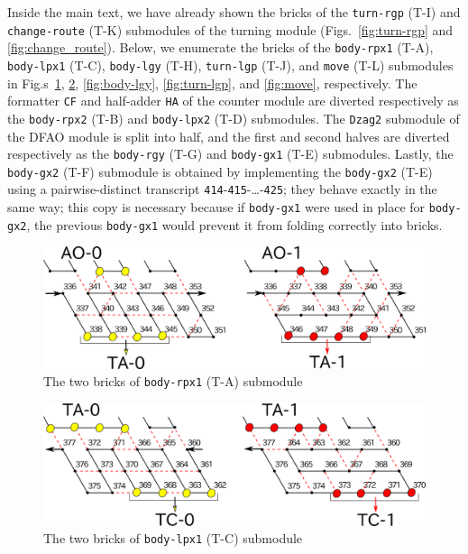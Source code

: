 \documentclass[runningheads]{llncs}
\begin{document}
Inside the main text, we have already shown the bricks of the \texttt{turn-rgp} (T-I) and \texttt{change-route} (T-K) submodules of the turning module (Figs.~\ref{fig:turn-rgp} and \ref{fig:change_route}). 
Below, we enumerate the bricks of the \texttt{body-rpx1} (T-A), \texttt{body-lpx1} (T-C), \texttt{body-lgy} (T-H), \texttt{turn-lgp} (T-J), and \texttt{move} (T-L) submodules in Fig.s~\ref{fig:body-rpx1}, \ref{fig:body-lpx1}, \ref{fig:body-lgy}, \ref{fig:turn-lgp}, and \ref{fig:move}, respectively. 
The formatter \texttt{CF} and half-adder \texttt{HA} of the counter module are diverted respectively as the \texttt{body-rpx2} (T-B) and \texttt{body-lpx2} (T-D) submodules. 
The \texttt{Dzag2} submodule of the DFAO module is split into half, and the first and second halves are diverted respectively as the \texttt{body-rgy} (T-G) and \texttt{body-gx1} (T-E) submodules. 
Lastly, the \texttt{body-gx2} (T-F) submodule is obtained by implementing the \texttt{body-gx2} (T-E) using a pairwise-distinct transcript \texttt{414}-\texttt{415}-\dots-\texttt{425}; they behave exactly in the same way; this copy is necessary because if \texttt{body-gx1} were used in place for \texttt{body-gx2}, the previous \texttt{body-gx1} would prevent it from folding correctly into bricks. 

\begin{figure}[h]
\centering
\includegraphics[width=\linewidth]{Figs/body-rpx1.png}
\caption{The two bricks of \texttt{body-rpx1} (T-A) submodule}
\label{fig:body-rpx1}
\end{figure}

\begin{figure}[h]
\centering
\includegraphics[width=\linewidth]{Figs/body-lpx1.png}
\caption{The two bricks of \texttt{body-lpx1} (T-C) submodule}
\label{fig:body-lpx1}
\end{figure}
\end{document}
